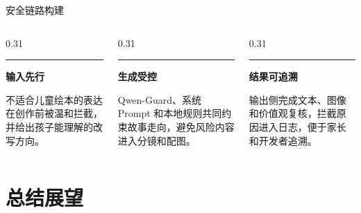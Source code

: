 \documentclass{beamer}
\newcommand{\sidehead}[2][buptred]{%
  {\color{#1}\rule[-0.15em]{2.5pt}{1.0em}}\hspace{0.45em}\textbf{\small\color{darkred}#2}\par
  \vspace{2pt}%
}
\begin{document}
\begin{frame}[t]{安全链路构建}
    \vspace{0.18cm}
    \begin{columns}[T, onlytextwidth]
        \begin{column}[T]{0.31\linewidth}
            \sidehead{输入先行}
            \scriptsize
            不适合儿童绘本的表达在创作前被温和拦截，并给出孩子能理解的改写方向。
        \end{column}
        \begin{column}[T]{0.31\linewidth}
            \sidehead[accentgold]{生成受控}
            \scriptsize
            Qwen-Guard、系统 Prompt 和本地规则共同约束故事走向，避免风险内容进入分镜和配图。
        \end{column}
        \begin{column}[T]{0.31\linewidth}
            \sidehead{结果可追溯}
            \scriptsize
            输出侧完成文本、图像和价值观复核，拦截原因进入日志，便于家长和开发者追溯。
        \end{column}
    \end{columns}
\end{frame}

\section{总结展望}
\end{document}

